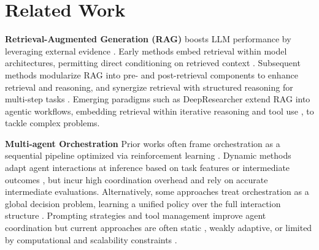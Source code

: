 \vspace{-10pt}
\section{Related Work}
\vspace{-10pt}
\label{sec:related_work}
\textbf{Retrieval-Augmented Generation (RAG)} boosts LLM performance by leveraging external evidence \citep{izacard2023atlas, lewis2020retrieval, gao2023retrieval, tang2024multihoprag, xiong-etal-2024-benchmarking, fan2024survey}. Early methods embed retrieval within model architectures, permitting direct conditioning on retrieved context \citep{Khandelwal2019GeneralizationTM, liu2024chatqa, izacard2020distilling, wang2023shall, borgeaud2022improving, izacard2023atlas, guu2020retrieval}. Subsequent methods modularize RAG into pre- \citep{chan2024rq, gao-etal-2023-precise, ma-etal-2023-query} and post-retrieval components \citep{abdallah2025rankify, xu2023recomp, li2025oreo} to enhance retrieval and reasoning, and synergize retrieval with structured reasoning for multi-step tasks \citep{jeong-etal-2024-adaptive, lee-etal-2024-planrag, asai2024self, shao-etal-2023-enhancing}. Emerging paradigms such as DeepResearcher \cite{zheng-etal-2025-deepresearcher, li2025webthinker, huang2025deep} extend RAG into agentic \citep{xie2025marsha, fang2025orion, chen2025mao, chen2025improving} workflows, embedding retrieval within iterative reasoning \citep{chen2025learning, shi2025iterative, li2025search, jin2025search, song2025r1} and tool use \citep{song2025r1, sun2025simpledeepsearcher}, to tackle complex problems.

\vspace{-4pt}
\textbf{Multi-agent Orchestration}  
Prior works \citep{chen2023agentverse, liu2024dynamic, qian2024scaling, khan2024debating, liang2024encouraging, wang2024rethinking, iqbal2022alma} often frame orchestration as a sequential pipeline optimized via reinforcement learning \citep{nie2025weak, wang2026agentconductor}. Dynamic methods adapt agent interactions at inference based on task features or intermediate outcomes \citep{yu2026adaptorch, yuan2025automated, zhang2026verified, chang2025sagallm}, but incur high coordination overhead and rely on accurate intermediate evaluations. Alternatively, some approaches treat orchestration as a global decision problem, learning a unified policy over the full interaction structure \citep{ke2026mas, Zhang2025AgentOrchestraOM}. Prompting strategies and tool management improve agent coordination \citep{lin2025mao, su2025toolorchestra, Zhang2025AgentOrchestraOH, dang2025multi, Du2024MultiAgentCV} but current approaches are often static \citep{zhou2026orch}, weakly adaptive, or limited by computational and scalability constraints \citep{choi2024malade}. 

